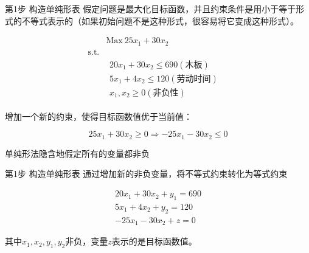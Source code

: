 \documentclass[mathserif, table]{beamer}
\begin{document}
\begin{frame}{第1步 构造单纯形表}
  假定问题是最大化目标函数，并且约束条件是用小于等于形式的不等式表示的（如果初始问题不是这种形式，很容易将它变成这种形式）。

  \[ 
  \begin{array}{lcl}
    & \mbox{Max}\ 25x_1 + 30x_2 & \\
    \mbox{s.t.} & &  \\
    &
    \begin{array}{c}
      20x_1 + 30x_2 \le 690 (\text{木板})\\
      5x_1 + 4x_2 \le 120 (\text{劳动时间})\\
      x_1, x_2 \ge 0 (\text{非负性})
    \end{array}
    &
  \end{array}
  \]

  增加一个新的约束，使得目标函数值优于当前值：

  \[
  25x_1 + 30x_2 \ge 0 \Longrightarrow -25x_1 - 30x_2 \le 0
  \]

  单纯形法隐含地假定所有的变量都非负

\end{frame}

\begin{frame}{第1步 构造单纯形表}
  通过增加新的非负变量，将不等式约束转化为等式约束

  \[
    \begin{array}{c}
      20x_1 + 30x_2 + y_1 = 690\\
      5x_1 + 4x_2 + y_2 =  120\\
      -25x_1 - 30x_2 + z = 0
    \end{array}
  \]

  其中$x_1, x_2, y_1, y_2$非负，变量$z$表示的是目标函数值。

\end{frame}
\end{document}
